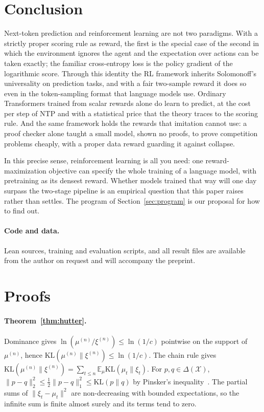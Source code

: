 \documentclass[11pt]{article}
\theoremstyle{definition}
\newcommand{\X}{\mathcal{X}}
\newcommand{\Del}{\Delta(\X)}
\newcommand{\E}{\mathbb{E}}
\newcommand{\KL}{\mathrm{KL}}
\begin{document}
\section{Conclusion}\label{sec:conclusion}

Next-token prediction and reinforcement learning are not two paradigms. With a strictly proper scoring rule as reward, the first is the special case of the second in which the environment ignores the agent and the expectation over actions can be taken exactly; the familiar cross-entropy loss is the policy gradient of the logarithmic score. Through this identity the RL framework inherits Solomonoff's universality on prediction tasks, and with a fair two-sample reward it does so even in the token-sampling format that language models use. Ordinary Transformers trained from scalar rewards alone do learn to predict, at the cost per step of NTP and with a statistical price that the theory traces to the scoring rule. And the same framework holds the rewards that imitation cannot use: a proof checker alone taught a small model, shown no proofs, to prove competition problems cheaply, with a proper data reward guarding it against collapse.

In this precise sense, reinforcement learning is all you need: one reward-maximization objective can specify the whole training of a language model, with pretraining as its densest reward. Whether models trained that way will one day surpass the two-stage pipeline is an empirical question that this paper raises rather than settles. The program of Section~\ref{sec:program} is our proposal for how to find out.

\paragraph{Code and data.} Lean sources, training and evaluation scripts, and all result files are available from the author on request and will accompany the preprint.

\appendix
\section{Proofs}\label{app:proofs}

\paragraph{Theorem~\ref{thm:hutter}.} Dominance gives $\ln(\mu^{(n)}/\xi^{(n)})\le\ln(1/c)$ pointwise on the support of $\mu^{(n)}$, hence $\KL(\mu^{(n)}\|\xi^{(n)})\le\ln(1/c)$. The chain rule gives $\KL(\mu^{(n)}\|\xi^{(n)})=\sum_{t\le n}\E_\mu\KL(\mu_t\|\xi_t)$. For $p,q\in\Del$, $\|p-q\|_2^2\le\frac12\|p-q\|_1^2\le\KL(p\|q)$ by Pinsker's inequality~\cite{csiszar1967}. The partial sums of $\|\xi_t-\mu_t\|^2$ are non-decreasing with bounded expectations, so the infinite sum is finite almost surely and its terms tend to zero.
\end{document}
